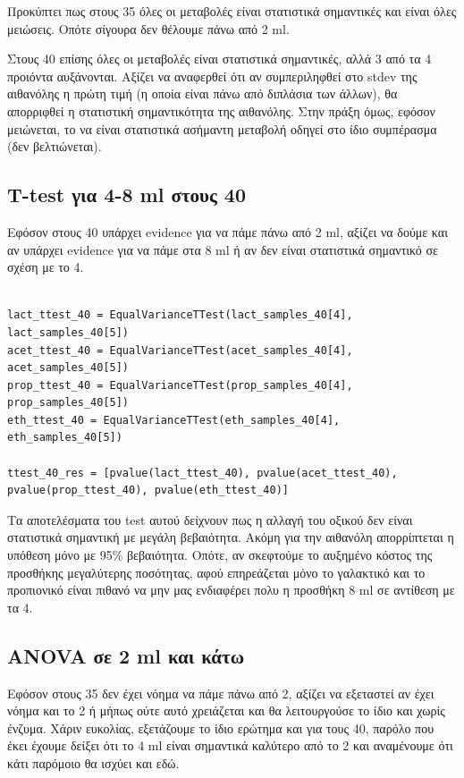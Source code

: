 \documentclass[11pt]{article}
\begin{document}
Προκύπτει πως στους 35 όλες οι μεταβολές είναι στατιστικά σημαντικές και είναι όλες μειώσεις. Οπότε σίγουρα δεν θέλουμε πάνω από 2 ml.

Στους 40 επίσης όλες οι μεταβολές είναι στατιστικά σημαντικές, αλλά 3 από τα 4 προιόντα αυξάνονται. Αξίζει να αναφερθεί ότι αν συμπεριληφθεί στο stdev της αιθανόλης η πρώτη τιμή (η οποία είναι πάνω από διπλάσια των άλλων), θα απορριφθεί η στατιστική σημαντικότητα της αιθανόλης. Στην πράξη όμως, εφόσον μειώνεται, το να είναι στατιστικά ασήμαντη μεταβολή οδηγεί στο ίδιο συμπέρασμα (δεν βελτιώνεται).

\subsection{T-test για 4-8 ml στους 40}
\label{sec:orga5861de}
Εφόσον στους 40 υπάρχει evidence για να πάμε πάνω από 2 ml, αξίζει να δούμε και αν υπάρχει evidence για να πάμε στα 8 ml ή αν δεν είναι στατιστικά σημαντικό σε σχέση με το 4.

\begin{verbatim}

lact_ttest_40 = EqualVarianceTTest(lact_samples_40[4], lact_samples_40[5])
acet_ttest_40 = EqualVarianceTTest(acet_samples_40[4], acet_samples_40[5])
prop_ttest_40 = EqualVarianceTTest(prop_samples_40[4], prop_samples_40[5])
eth_ttest_40 = EqualVarianceTTest(eth_samples_40[4], eth_samples_40[5])

ttest_40_res = [pvalue(lact_ttest_40), pvalue(acet_ttest_40), pvalue(prop_ttest_40), pvalue(eth_ttest_40)]
\end{verbatim}

Τα αποτελέσματα του test αυτού δείχνουν πως η αλλαγή του οξικού δεν είναι στατιστικά σημαντική με μεγάλη βεβαιότητα. Ακόμη για την αιθανόλη απορρίπτεται η υπόθεση μόνο με 95\% βεβαιότητα. Οπότε, αν σκεφτούμε το αυξημένο κόστος της προσθήκης μεγαλύτερης ποσότητας, αφού επηρεάζεται μόνο το γαλακτικό και το προπιονικό είναι πιθανό να μην μας ενδιαφέρει πολυ η προσθήκη 8 ml σε αντίθεση με τα 4.

\subsection{ANOVA σε 2 ml και κάτω}
\label{sec:org14afa7e}
Εφόσον στους 35 δεν έχει νόημα να πάμε πάνω από 2, αξίζει να εξεταστεί αν έχει νόημα και το 2 ή μήπως ούτε αυτό χρειάζεται και θα λειτουργούσε το ίδιο και χωρίς ένζυμα. Χάριν ευκολίας, εξετάζουμε το ίδιο ερώτημα και για τους 40, παρόλο που έκει έχουμε δείξει ότι το 4 ml είναι σημαντικά καλύτερο από το 2 και αναμένουμε ότι κάτι παρόμοιο θα ισχύει και εδώ.
\end{document}
